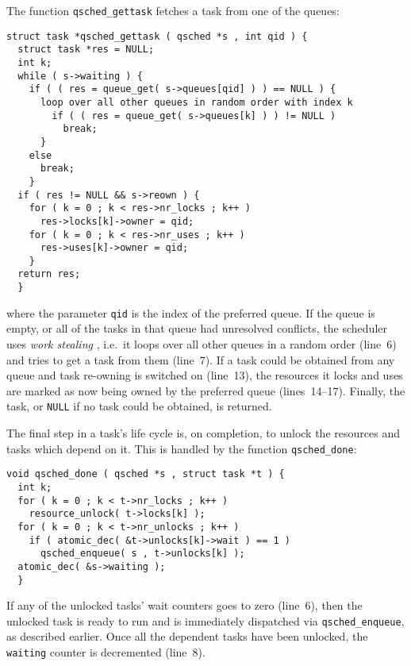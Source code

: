\documentclass[preprint]{elsarticle}
\begin{document}
The function {\tt qsched\_gettask} fetches a task from
one of the queues:
\begin{center}\begin{minipage}{0.9\textwidth}
    \begin{lstlisting}
struct task *qsched_gettask ( qsched *s , int qid ) {
  struct task *res = NULL;
  int k;
  while ( s->waiting ) {
    if ( ( res = queue_get( s->queues[qid] ) ) == NULL ) {
      loop over all other queues in random order with index k
        if ( ( res = queue_get( s->queues[k] ) ) != NULL )
          break;
      }
    else
      break;
    }
  if ( res != NULL && s->reown ) {
    for ( k = 0 ; k < res->nr_locks ; k++ )
      res->locks[k]->owner = qid;
    for ( k = 0 ; k < res->nr_uses ; k++ )
      res->uses[k]->owner = qid;
    }
  return res;
  }
    \end{lstlisting}
\end{minipage}\end{center}
\noindent where the parameter {\tt qid} is the index of the
preferred queue.
If the queue is empty, or all of the tasks in that queue had
unresolved conflicts, the scheduler uses {\em work stealing}
\cite{ref:Blumofe1999}, i.e.~it loops over all other queues
in a random order (line~6) and tries to get a task from them
(line~7).
If a task could be obtained from any queue and task re-owning
is switched on (line~13),
the resources it locks and uses are marked as now being owned
by the preferred queue (lines~14--17).
Finally, the task, or {\tt NULL} if no task could be obtained,
is returned.

The final step in a task's life cycle is, on completion,
to unlock the resources and tasks which depend on it.
This is handled by the function {\tt qsched\_done}:
\begin{center}\begin{minipage}{0.9\textwidth}
    \begin{lstlisting}
void qsched_done ( qsched *s , struct task *t ) {
  int k;
  for ( k = 0 ; k < t->nr_locks ; k++ )
    resource_unlock( t->locks[k] );
  for ( k = 0 ; k < t->nr_unlocks ; k++ )
    if ( atomic_dec( &t->unlocks[k]->wait ) == 1 )
      qsched_enqueue( s , t->unlocks[k] );
  atomic_dec( &s->waiting );
  }
    \end{lstlisting}
\end{minipage}\end{center}
\noindent If any of the unlocked tasks' wait counters
goes to zero (line~6), then the unlocked task is ready to
run and is immediately dispatched via {\tt qsched\_enqueue},
as described earlier.
Once all the dependent tasks have been unlocked, the
{\tt waiting} counter is decremented (line~8).
\end{document}
